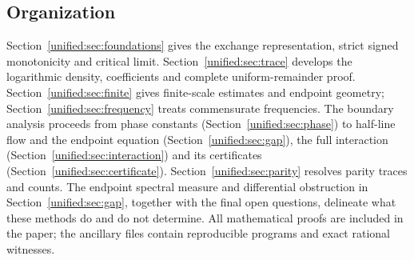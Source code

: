 \subsection*{Organization}
Section~\ref{unified:sec:foundations} gives the exchange representation,
strict signed monotonicity and critical limit.
Section~\ref{unified:sec:trace} develops the logarithmic density,
coefficients and complete uniform-remainder proof.
Section~\ref{unified:sec:finite} gives finite-scale estimates and
endpoint geometry; Section~\ref{unified:sec:frequency} treats
commensurate frequencies.
The boundary analysis proceeds from phase constants
(Section~\ref{unified:sec:phase}) to half-line flow and the endpoint
equation (Section~\ref{unified:sec:gap}), the full interaction
(Section~\ref{unified:sec:interaction}) and its certificates
(Section~\ref{unified:sec:certificate}).
Section~\ref{unified:sec:parity} resolves parity traces and counts.
The endpoint spectral measure and differential obstruction in
Section~\ref{unified:sec:gap}, together with the final open questions,
delineate what these methods do and do not determine. All mathematical proofs are
included in the paper; the ancillary files contain reproducible
programs and exact rational witnesses.
